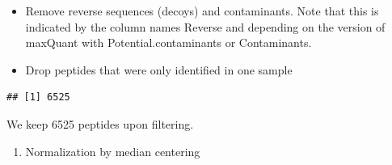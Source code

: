 \documentclass[
]{article}
\newenvironment{Shaded}{\begin{snugshade}}{\end{snugshade}}
\newcommand{\DecValTok}[1]{\textcolor[rgb]{0.00,0.00,0.81}{#1}}
\newcommand{\FunctionTok}[1]{\textcolor[rgb]{0.00,0.00,0.00}{#1}}
\newcommand{\NormalTok}[1]{#1}
\newcommand{\OtherTok}[1]{\textcolor[rgb]{0.56,0.35,0.01}{#1}}
\newcommand{\SpecialCharTok}[1]{\textcolor[rgb]{0.00,0.00,0.00}{#1}}
\newcommand{\StringTok}[1]{\textcolor[rgb]{0.31,0.60,0.02}{#1}}
\providecommand{\tightlist}{%
  \setlength{\itemsep}{0pt}\setlength{\parskip}{0pt}}
\begin{document}
\begin{itemize}
\tightlist
\item
  Remove reverse sequences (decoys) and contaminants. Note that this is
  indicated by the column names Reverse and depending on the version of
  maxQuant with Potential.contaminants or Contaminants.
\end{itemize}

\begin{Shaded}
\end{Shaded}

\begin{itemize}
\tightlist
\item
  Drop peptides that were only identified in one sample
\end{itemize}

\begin{Shaded}
\end{Shaded}

\begin{verbatim}
## [1] 6525
\end{verbatim}

We keep 6525 peptides upon filtering.

\begin{enumerate}
\def\labelenumi{\arabic{enumi}.}
\setcounter{enumi}{2}
\tightlist
\item
  Normalization by median centering
\end{enumerate}
\end{document}
